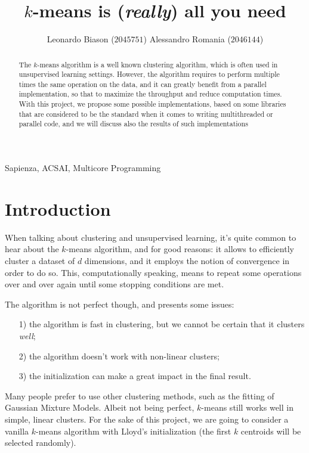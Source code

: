 \documentclass[11pt, journal]{IEEEtran}
\title{$k$-means is (\textit{really}) all you need}
\author{Leonardo Biason ($2045751$) \quad Alessandro Romania ($2046144$)}
\newcommand{\nwl}{

\vspace{11pt}

}
\begin{document}
\maketitle

\begin{abstract}
    The $k$-means algorithm is a well known clustering algorithm, which is often used in unsupervised learning settings. However, the algorithm requires to perform multiple times the same operation on the data, and it can greatly benefit from a parallel implementation, so that to maximize the throughput and reduce computation times. With this project, we propose some possible implementations, based on some libraries that are considered to be the  standard when it comes to writing multithreaded or parallel code, and we will discuss also the results of such implementations
\end{abstract}

\begin{keywords}
    Sapienza, ACSAI, Multicore Programming
\end{keywords}
\nwl

\section{Introduction}

When talking about clustering and unsupervised learning, it's quite common to hear about the $k$-means algorithm, and for good reasons: it allows to efficiently cluster a dataset of $d$ dimensions, and it employs the notion of convergence in order to do so. This, computationally speaking, means to repeat some operations over and over again until some stopping conditions are met.
\nwl
The algorithm is not perfect though, and presents some issues:
\begin{itemize}
    \item [1)] the algorithm is fast in clustering, but we cannot be certain that it clusters \textit{well};
    \item [2)] the algorithm doesn't work with non-linear clusters;
    \item [3)] the initialization can make a great impact in the final result.
\end{itemize}
\nwl
Many people prefer to use other clustering methods, such as the fitting of Gaussian Mixture Models. Albeit not being perfect, $k$-means still works well in simple, linear clusters. For the sake of this project, we are going to consider a vanilla $k$-means algorithm with Lloyd's initialization (the first $k$ centroids will be selected randomly).
\end{document}
